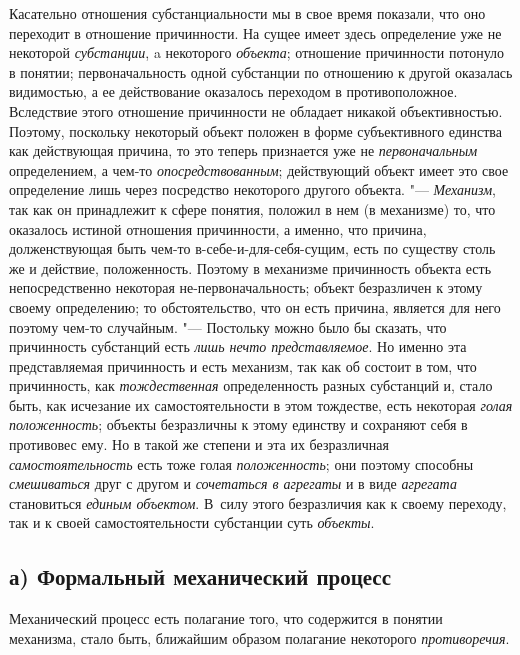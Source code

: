 {{Касательно отношения субстанциальности мы в свое время
показали, что оно переходит в отношение причинности. На сущее имеет здесь
определение уже не некоторой {\em субстанции}, a некоторого {\em объекта};
отношение причинности потонуло в понятии; первоначальность
одной субстанции по отношению к другой оказалась видимостью, а ее
действование оказалось переходом в противоположное. Вследствие этого
отношение причинности не обладает никакой объективностью. Поэтому,
поскольку некоторый объект положен в форме субъективного единства как
действующая причина, то это теперь признается уже не {\em первоначальным}
определением, а чем-то {\em опосредствованным};
действующий объект имеет это свое определение лишь через
посредство некоторого другого объекта. "--- {\em Механизм}, так как он
принадлежит к сфере понятия, положил в нем (в механизме) то, что оказалось
истиной отношения причинности, а именно, что причина, долженствующая быть
чем-то в-себе-и-для-себя-сущим, есть по существу столь же и действие,
положенность. Поэтому в механизме причинность объекта есть непосредственно
некоторая не-первоначальность; объект безразличен к этому своему
определению; то обстоятельство, что он есть причина, является для него
поэтому чем-то случайным. "--- Постольку можно было бы сказать,
что причинность субстанций есть {\em лишь нечто представляемое}.
Но именно эта представляемая причинность и есть механизм, так
как об состоит в том, что причинность, как {\em тождественная}
определенность разных субстанций и, стало быть, как исчезание
их самостоятельности в этом тождестве, есть некоторая {\em голая положенность};
объекты безразличны к этому единству и сохраняют себя в
противовес ему. Но в такой же степени и эта их безразличная
{\em самостоятельность} есть тоже голая {\em положенность}; они
поэтому способны {\em смешиваться} друг с другом и {\em сочетаться в агрегаты}
и в виде {\em агрегата} становиться {\em единым
объектом}. В~силу этого безразличия как к своему переходу,
так и к своей самостоятельности субстанции суть {\em объекты}.

\subsection[а) Формальный механический процесс]{а) Формальный механический процесс}
Механический процесс есть полагание того, что содержится в понятии механизма,
стало быть, ближайшим образом полагание некоторого {\em противоречия}.


}}

